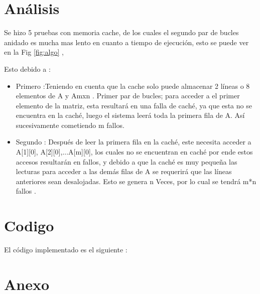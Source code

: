 \documentclass[12pt]{article}
\begin{document}
\newpage
\section{Análisis}



Se hizo 5 pruebas con memoria cache, de los cuales el segundo par de bucles anidado es mucha
mas lento en cuanto a tiempo de ejecución, esto se puede ver en la Fig \ref{fig:algo} ,

Esto debido a :

\begin{itemize}
  \item Primero :Teniendo en cuenta que la cache solo puede almacenar 2 líneas o 8 elementos de A y Amxn .
  Primer par de bucles; para acceder a el primer elemento de la matriz, esta resultará en una
 falla de caché, ya que esta no se encuentra en la caché, luego el sistema leerá toda la primera
 fila de A. Así  sucesivamente cometiendo m fallos.

 \item  Segundo : Después de leer la primera fila en la caché, este necesita acceder
 a A[1][0], A[2][0],...A[m][0], los cuales no se encuentran en caché por ende estos accesos
 resultarán en fallos, y debido a que la caché es muy pequeña las lecturas para acceder a las
 demás filas de A se requerirá que las líneas anteriores sean desalojadas. Esto se genera n
 Veces, por lo cual se tendrá m*n fallos\cite{cormen2022introduction}
 .
\end{itemize}

\section{Codigo}


El código \cite{pacheco2011introduction} implementado es el siguiente :






\section{Anexo}
\end{document}
